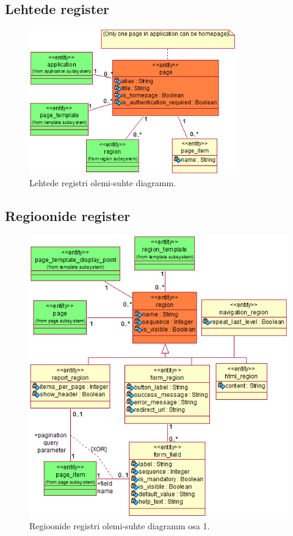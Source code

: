 \documentclass[a4paper,12pt]{article} %
\begin{document}
\subsection*{Lehtede register}
\begin{figure}[H]
\centering
\includegraphics[width=0.8\textwidth]{./diagrams/page-er-diagram.png}
\caption{Lehtede registri olemi-suhte diagramm.}
\label{fig_lehtede_registri_olemi_suhte_diagramm}
\end{figure}

\subsection*{Regioonide register}
\begin{figure}[H]
\centering
\includegraphics[width=\textwidth]{./diagrams/region-er-diagram.png}
\caption{Regioonide registri olemi-suhte diagramm osa 1.}
\label{fig_regioonide_registri_olemi_suhte_diagramm}
\end{figure}
\end{document}
